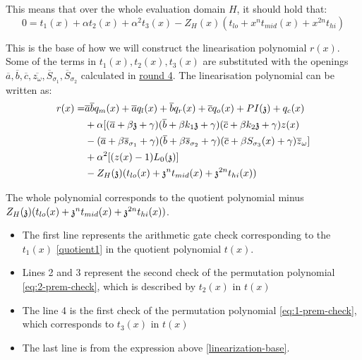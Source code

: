 This means that over the whole evaluation domain $H$, it should hold that: 
\begin{equation}
    \label{linearization-base}
    0 = t_1(x) + \alpha t_2(x) + \alpha^2 t_3(x) - Z_H(x)(t_{lo} + x^{n}t_{mid}(x) + x^{2n}t_{hi})
\end{equation}

This is the base of how we will construct the linearisation polynomial $r(x)$. Some of the terms in $t_1(x), t_2(x), t_3(x)$ are substituted with the openings $\overline{a}, \overline{b}, \overline{c}, \overline{z_\omega}, \overline{S}_{\sigma_1}, \overline{S}_{\sigma_2}$ calculated in \hyperref[chap:round4]{round 4}. The linearisation polynomial can be written as:
\begin{align*}
    r(x) = &\overline{a}\overline{b}q_m(x) + \overline{a}q_l(x) + \overline{b}q_r(x) + \overline{c}q_o(x) + PI(\mathfrak{z}) + q_c(x) \\
           &+\alpha [(\overline{a} + \beta \mathfrak{z} + \gamma)(\overline{b} + \beta k_1 \mathfrak{z} + \gamma)(\overline{c} + \beta k_2 \mathfrak{z} + \gamma)z(x) \\
           &-(\overline{a} + \beta \overline{s}_{\sigma_1} + \gamma)(\overline{b} + \beta \overline{s}_{\sigma_2} + \gamma)(\overline{c} + \beta S_{\sigma_3}(x) + \gamma)\overline{z}_{\omega}] \\
           &+\alpha^2 [(z(x) -1)L_0(\mathfrak{z})] \\
           &-Z_H(\mathfrak{z})(t_{lo}(x) + \mathfrak{z}^n t_{mid}(x) + \mathfrak{z}^{2n} t_{hi}(x))
\end{align*}

The whole polynomial corresponds to the quotient polynomial minus $Z_H(\mathfrak{z})(t_{lo}(x) + \mathfrak{z}^n t_{mid}(x) + \mathfrak{z}^{2n} t_{hi}(x))$.
\begin{itemize}
    \item The first line represents the arithmetic gate check corresponding to the $t_1(x)$ \ref{quotient1} in the quotient polynomial $t(x)$. 
    \item Lines 2 and 3 represent the second check of the permutation polynomial \ref{eq:2-prem-check}, which is described by $t_2(x)$ in $t(x)$
    \item The line 4 is the first check of the permutation polynomial \ref{eq:1-prem-check}, which corresponds to $t_3(x)$ in $t(x)$
    \item The last line is from the expression above \ref{linearization-base}.
\end{itemize}

